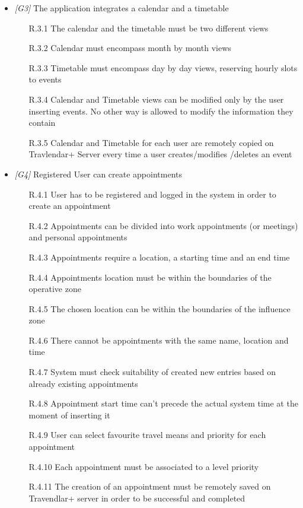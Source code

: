 \begin{itemize}
                  
\item \textit{[G3]} The application integrates a calendar and a timetable

                  \begin{itemize}
                  
                  \item [R.3.1] The calendar and the timetable must be two different views 
                  \item [R.3.2] Calendar must encompass month by month views
                  \item [R.3.3] Timetable must encompass day by day views, reserving hourly slots to events
                  \item [R.3.4] Calendar and Timetable views can be modified only by the user inserting events. No other way is allowed to modify the information they contain
                  \item [R.3.5] Calendar and Timetable for each user are remotely copied on Travlendar+ Server every time a user creates/modifies /deletes an event
                        
                  \end{itemize}
                  
\item \textit{[G4]} Registered User can create appointments 

 \begin{itemize}
                        \item [R.4.1] User has to be registered and logged in the system in order to create an
appointment
                        \item [R.4.2] Appointments can be divided into work appointments (or meetings) and personal appointments
                        \item [R.4.3] Appointments require a location, a starting time and an end time
                        \item [R.4.4] Appointments location must be within the boundaries of the operative zone
                        \item [R.4.5] The chosen location can be within the boundaries of the influence zone
                        \item [R.4.6] There cannot be appointments with the same name, location and time
                        \item [R.4.7] System must check suitability of created new entries based on already existing appointments
                        \item [R.4.8] Appointment start time can't precede the actual system time at the moment of inserting it                                 														\item [R.4.9] User can select favourite travel means and priority for each appointment
                        \item [R.4.10] Each appointment must be associated to a level priority
                        \item [R.4.11] The creation of an appointment must be remotely saved on Travendlar+ server in order to be successful and completed
                        

\end{itemize}
\end{itemize}
